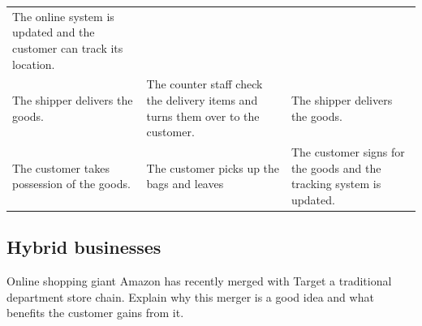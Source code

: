 \documentclass[]{book}
\let\BeginKnitrBlock\begin \let\EndKnitrBlock\end
\begin{document}
\begin{longtable}[]{@{}lll@{}}
\begin{minipage}[t]{0.38\columnwidth}
The online system is updated and the customer can track its location.\strut
\end{minipage}\tabularnewline
\begin{minipage}[t]{0.15\columnwidth}\raggedright
The shipper delivers the goods.\strut
\end{minipage} & \begin{minipage}[t]{0.38\columnwidth}\raggedright
The counter staff check the delivery items and turns them over to the customer.\strut
\end{minipage} & \begin{minipage}[t]{0.38\columnwidth}\raggedright
The shipper delivers the goods.\strut
\end{minipage}\tabularnewline
\begin{minipage}[t]{0.15\columnwidth}\raggedright
The customer takes possession of the goods.\strut
\end{minipage} & \begin{minipage}[t]{0.38\columnwidth}\raggedright
The customer picks up the bags and leaves\strut
\end{minipage} & \begin{minipage}[t]{0.38\columnwidth}\raggedright
The customer signs for the goods and the tracking system is updated.\strut
\end{minipage}\tabularnewline
\bottomrule
\end{longtable}

\BeginKnitrBlock{rmddiscussion}
\hypertarget{hybrid-businesses}{%
\section{Hybrid businesses}\label{hybrid-businesses}}

Online shopping giant Amazon has recently merged with Target a traditional department store chain. Explain why this merger is a good idea and what benefits the customer gains from it.
\EndKnitrBlock{rmddiscussion}


\end{document}
